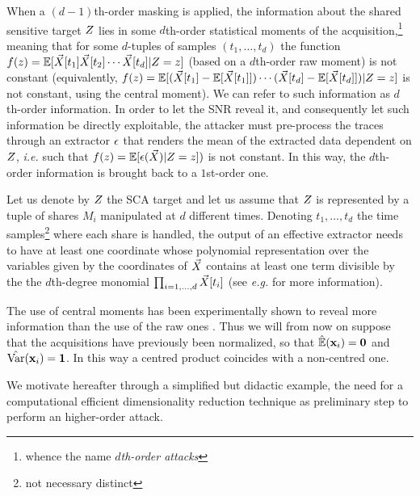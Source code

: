 When a $(d-1)$th-order masking is applied, the information about the shared sensitive target $Z$ lies in some $d$th-order statistical moments of the acquisition,\footnote{whence the name {\em $d$th-order attacks}} meaning that for some $d$-tuples of samples $(t_1,\dots ,t_d)$ the function $f(z) = \mathbb{E}[\vec{X}[t_1]\vec{X}[t_2]\cdots \vec{X}[t_d]\vert Z=z]$ (based on a $d$th-order raw moment) is not constant (equivalently, $f(z) = \mathbb{E}[(\vec{X}[t_1]-\mathbb{E}[\vec{X}[t_1]])\cdots (\vec{X}[t_d]-\mathbb{E}[\vec{X}[t_d]])\vert Z=z]$ is not constant, using the central moment). We can refer to such information as $d$th-order information.
In order to let the SNR reveal it, and consequently let such information be directly exploitable, the attacker must pre-process the traces through an extractor $\epsilon$ that renders the mean of the extracted data dependent on $Z$, \emph{i.e.} such that $f(z) = \mathbb{E}[\epsilon(\vec{X})\vert Z=z])$ is not constant. In this way, the $d$th-order information is brought back to a $1$st-order one.

\begin{property}\label{property:poly}
Let us denote by $Z$ the SCA target and let us assume that $Z$ is represented by a tuple of shares $M_i$ manipulated at $d$ different times. Denoting $t_1,\dots,t_d$ the time samples\footnote{not necessary distinct} where each share is handled, the output of an effective extractor needs to have at least one coordinate whose polynomial representation over the variables given by the coordinates of $\vec{X}$ contains at least one term divisible by the the $d$th-degree monomial $\prod_{i=1,\dots,d}\vec{X}[t_i]$ (see \emph{e.g.} \cite{carlet2014achieving} for more information).
\end{property}


\begin{remark}\label{remark:normalized}
The use of central moments has been experimentally shown to reveal more information than the use of the raw ones \cite{chari1999towards,ProuffRB09}. Thus we will from now on suppose that the acquisitions have previously been normalized, so that $\hat{\mathbb{E}}(\textbf{x}_i) = \boldsymbol{0}$ and $\hat{\mathrm{Var}}(\textbf{x}_i) = \boldsymbol{1}$. In this way a centred product coincides with a non-centred one. 
\end{remark}

We motivate hereafter through a simplified but didactic  example, the need for a computational efficient dimensionality reduction technique as preliminary step to perform an higher-order attack.


